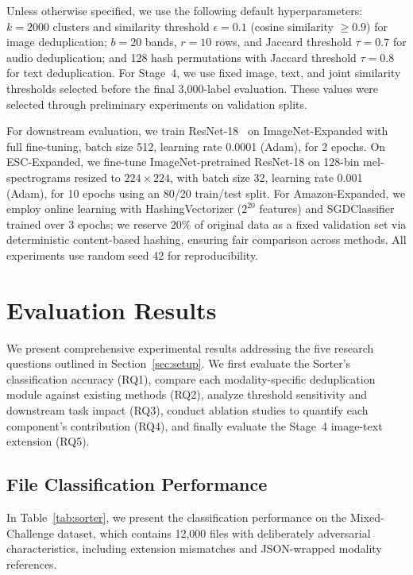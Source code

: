 \documentclass[conference]{IEEEtran}
\begin{document}
Unless otherwise specified, we use the following default hyperparameters: $k = 2000$ clusters and similarity threshold $\epsilon = 0.1$ (cosine similarity $\geq 0.9$) for image deduplication; $b = 20$ bands, $r = 10$ rows, and Jaccard threshold $\tau = 0.7$ for audio deduplication; and 128 hash permutations with Jaccard threshold $\tau = 0.8$ for text deduplication. For Stage~4, we use fixed image, text, and joint similarity thresholds selected before the final 3,000-label evaluation. These values were selected through preliminary experiments on validation splits.

For downstream evaluation, we train ResNet-18~\cite{he2016deep} on ImageNet-Expanded with full fine-tuning, batch size 512, learning rate 0.0001 (Adam), for 2 epochs. On ESC-Expanded, we fine-tune ImageNet-pretrained ResNet-18 on 128-bin mel-spectrograms resized to $224 \times 224$, with batch size 32, learning rate 0.001 (Adam), for 10 epochs using an 80/20 train/test split. For Amazon-Expanded, we employ online learning with HashingVectorizer ($2^{20}$ features) and SGDClassifier trained over 3 epochs; we reserve 20\% of original data as a fixed validation set via deterministic content-based hashing, ensuring fair comparison across methods. All experiments use random seed 42 for reproducibility.


\section{Evaluation Results}
\label{sec:results}
We present comprehensive experimental results addressing the five research questions outlined in Section~\ref{sec:setup}. We first evaluate the Sorter's classification accuracy (RQ1), compare each modality-specific deduplication module against existing methods (RQ2), analyze threshold sensitivity and downstream task impact (RQ3), conduct ablation studies to quantify each component's contribution (RQ4), and finally evaluate the Stage~4 image-text extension (RQ5).

\subsection{File Classification Performance}

In Table~\ref{tab:sorter}, we present the classification performance on the Mixed-Challenge dataset, which contains 12,000 files with deliberately adversarial characteristics, including extension mismatches and JSON-wrapped modality references.
\end{document}
